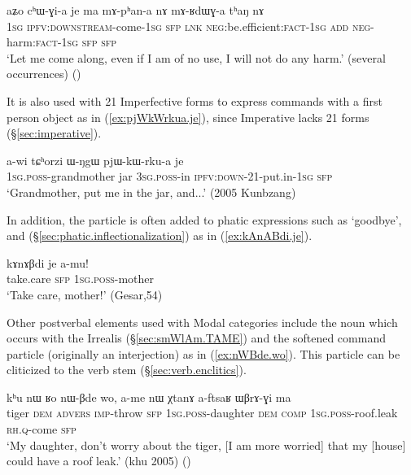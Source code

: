 \begin{exe}
\ex \label{ex:chWGia.je}
\gll  aʑo cʰɯ-ɣi-a je ma mɤ-pʰan-a nɤ mɤ-ʁdɯɣ-a tʰaŋ nɤ \\
\textsc{1sg} \textsc{ipfv}:\textsc{downstream}-come-\textsc{1sg} \textsc{sfp} \textsc{lnk} \textsc{neg}:be.efficient:\textsc{fact}-\textsc{1sg} \textsc{add} \textsc{neg}-harm:\textsc{fact}-\textsc{1sg} \textsc{sfp} \textsc{sfp} \\
\glt `Let me come along, even if I am of no use, I will not do any harm.' (several occurrences)
()
\end{exe}

It is also used with 2\fl{}1 Imperfective forms to express  commands with a first person object as in (\ref{ex:pjWkWrkua.je}), since Imperative lacks 2\fl{}1 forms (§\ref{sec:imperative}).

\begin{exe}
\ex \label{ex:pjWkWrkua.je}
\gll a-wi tɕʰorzi ɯ-ŋgɯ pjɯ-kɯ-rku-a je\\
\textsc{1sg}.\textsc{poss}-grandmother jar \textsc{3sg}.\textsc{poss}-in \textsc{ipfv}:\textsc{down}-2\fl{}1-put.in-\textsc{1sg} \textsc{sfp}\\
\glt `Grandmother, put me in the jar, and...' (2005 Kunbzang)
\end{exe}

In addition, the particle  is often added to phatic expressions such as  `goodbye',  and  (§\ref{sec:phatic.inflectionalization}) as in (\ref{ex:kAnABdi.je}).


\begin{exe}
\ex \label{ex:kAnABdi.je}
\gll kɤnɤβdi je a-mu! \\
take.care \textsc{sfp} \textsc{1sg}.\textsc{poss}-mother \\
\glt `Take care, mother!' (Gesar,54)
\end{exe}

Other postverbal elements used with Modal categories include the noun  which occurs with the Irrealis (§\ref{sec:smWlAm.TAME}) and the softened command particle  (originally an interjection) as in (\ref{ex:nWBde.wo}). This particle can be cliticized to the verb stem (§\ref{sec:verb.enclitics}).

\begin{exe}
\ex \label{ex:nWBde.wo}
\gll  kʰu nɯ ʁo nɯ-βde wo, a-me nɯ χtanɤ a-ftsaʁ ɯβrɤ-ɣi ma \\
tiger \textsc{dem} \textsc{advers} \textsc{imp}-throw \textsc{sfp} \textsc{1sg}.\textsc{poss}-daughter \textsc{dem} \textsc{comp} \textsc{1sg}.\textsc{poss}-roof.leak \textsc{rh}.\textsc{q}-come \textsc{sfp} \\
\glt `My daughter, don't worry about the tiger, [I am more worried] that my [house] could have a roof leak.' (khu 2005)
()
\end{exe}

